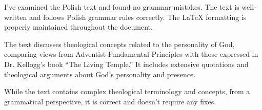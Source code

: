 I've examined the Polish text and found no grammar mistakes. The text is well-written and follows Polish grammar rules correctly. The LaTeX formatting is properly maintained throughout the document.

The text discusses theological concepts related to the personality of God, comparing views from Adventist Fundamental Principles with those expressed in Dr. Kellogg's book “The Living Temple.” It includes extensive quotations and theological arguments about God's personality and presence.

While the text contains complex theological terminology and concepts, from a grammatical perspective, it is correct and doesn't require any fixes.